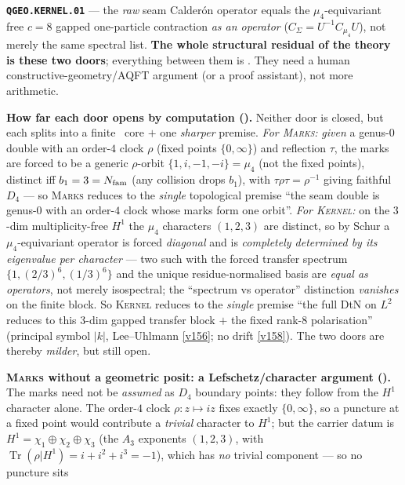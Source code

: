 \begin{keybox}
\textbf{\texttt{QGEO.KERNEL.01}} --- the \emph{raw} seam Calder\'on operator equals the
$\mu_4$-equivariant free $c{=}8$ gapped one-particle contraction \emph{as an operator}
($C_\Sigma=U^{-1}C_{\mu_4}U$), not merely the same spectral list. \textbf{The whole structural
residual of the theory is these two doors}; everything between them is \mE. They need a human
constructive-geometry/AQFT argument (or a proof assistant), not more arithmetic.
\par\smallskip\noindent\textbf{How far each door opens by computation ().}
Neither door is closed, but each splits into a finite \mE\ core $+$ one \emph{sharper} premise.
\emph{For \textsc{Marks}:} \emph{given} a genus-$0$ double with an order-$4$ clock $\rho$ (fixed points
$\{0,\infty\}$) and reflection $\tau$, the marks are forced to be a generic $\rho$-orbit
$\{1,i,-1,-i\}=\mu_4$ (not the fixed points), distinct iff $b_1=3=N_{\mathrm{fam}}$ (any collision drops $b_1$),
with $\tau\rho\tau=\rho^{-1}$ giving faithful $D_4$ --- so \textsc{Marks} reduces to the \emph{single}
topological premise ``the seam double is genus-$0$ with an order-$4$ clock whose marks form one
orbit''. \emph{For \textsc{Kernel}:} on the $3$-dim multiplicity-free $H^1$ the $\mu_4$ characters
$(1,2,3)$ are distinct, so by Schur a $\mu_4$-equivariant operator is forced \emph{diagonal} and is
\emph{completely determined by its eigenvalue per character} --- two such with the forced transfer
spectrum $\{1,(2/3)^6,(1/3)^6\}$ and the unique residue-normalised basis are \emph{equal as
operators}, not merely isospectral; the ``spectrum vs operator'' distinction \emph{vanishes} on the
finite block. So \textsc{Kernel} reduces to the \emph{single} premise ``the full DtN on $L^2$ reduces
to this $3$-dim gapped transfer block $+$ the fixed rank-$8$ polarisation'' (principal symbol $|k|$,
Lee--Uhlmann \vref{v156}; no drift \vref{v158}). The two doors are thereby \emph{milder}, but still open.
\par\smallskip\noindent\textbf{\textsc{Marks} without a geometric posit: a Lefschetz/character argument
().} The marks need not be \emph{assumed} as $D_4$ boundary
points: they follow from the $H^1$ character alone. The order-$4$ clock $\rho{:}z\mapsto iz$ fixes exactly
$\{0,\infty\}$, so a puncture at a fixed point would contribute a \emph{trivial} character to $H^1$; but the
carrier datum is $H^1=\chi_1\oplus\chi_2\oplus\chi_3$ (the $A_3$ exponents $(1,2,3)$, with
$\operatorname{Tr}(\rho|H^1)=i+i^2+i^3=-1$), which has \emph{no} trivial component --- so no puncture sits

\end{keybox}
